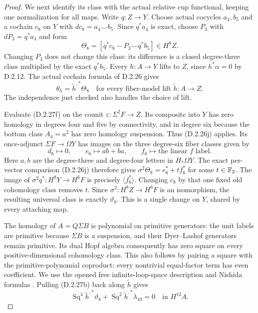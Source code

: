 \begin{proof}
We next identify its class with the actual relative cup
functional, keeping one normalization for all maps.
Write $q:Z\to Y$. Choose actual cocycles $a_4,b_5$ and a
cochain $c_8$ on $Y$ with $dc_8=a_4\smile b_5$.
Since $q^*a_4$ is exact, choose $P_3$ with
$dP_3=q^*a_4$ and form
\[
 \Theta_8=[q^*c_8-P_3\smile q^*b_5]\in H^8Z.
 \tag{D.2.27f}
\]
Changing $P_3$ does not change this class: its difference
is a closed degree-three class multiplied by the exact
$q^*b_5$. Every $h:A\to Y$ lifts to $Z$, since
$h^*\alpha=0$ by \textup{D.2.12}. The actual cochain formula
of \textup{D.2.26} gives
\[
 \theta_h=\widetilde h^{,*}\Theta_8
 \quad\text{for every fiber-model lift }\widetilde h:A\to Z.
 \tag{D.2.27g}
\]
The independence just checked also handles the choice of lift.

Evaluate \textup{(D.2.27f)} on the counit
$\varepsilon:\Sigma^2F\to Z$. Its composite into $Y$ has
zero homology in degrees four and five by connectivity,
and in degree six because the bottom class $A_4=a^2$
has zero homology suspension. Thus \textup{(D.2.26j)} applies.
Its once-adjunct $\Sigma F\to\Omega Y$ has images on the
three degree-six fiber classes given by
\[
 d_6\longmapsto0,\qquad e_6\longmapsto ab+ba,
       \qquad f_6\longmapsto \text{the linear }f\text{ label}.
 \tag{D.2.27h}
\]
Here $a,b$ are the degree-three and degree-four letters in
$H_*\Omega Y$. The exact per-vector comparison
\textup{(D.2.26j)} therefore gives
$\sigma^2\Theta_8=e_6^*+t f_6^*$ for some $t\in\mathbb F_2$.
The image of $\sigma^2q^*:H^8Y\to H^6F$ is precisely
$\langle f_6^*\rangle$. Changing $c_8$ by that one fixed
old cohomology class removes $t$. Since
$\sigma^2:H^8Z\to H^6F$ is an isomorphism, the resulting
universal class is exactly $\vartheta_8$.
This is a single change on $Y$, shared by every attaching map.

The homology of $A=Q\Sigma B$ is polynomial on primitive
generators: the unit labels are primitive because $\Sigma B$
is a suspension, and their Dyer--Lashof generators remain
primitive. Its dual Hopf algebra consequently has zero square
on every positive-dimensional cohomology class. This also
follows by pairing a square with the primitive-polynomial
coproduct: every nontrivial equal-factor term has even
coefficient. We use the opened free infinite-loop-space
description and Nishida formulas
\cite[Chapters I and III]{I_CohenLadaMay1976}.
Pulling \textup{(D.2.27b)} back along $\widetilde h$ gives
\[
 \operatorname{Sq}^4\widetilde h^{,*}\vartheta_8+
 \operatorname{Sq}^2\widetilde h^{,*}\lambda_{10}=0
                         \quad\text{in }H^{12}A.
 \tag{D.2.27i}
\]


\end{proof}
